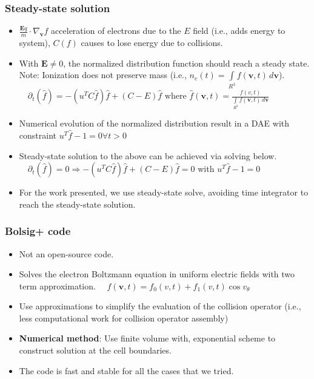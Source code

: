 \documentclass[mathserif, aspectratio=169]{beamer}
\newcommand{\vect}[1]{\boldsymbol{#1}}
\newcommand{\myint}{\int\limits}
\newcommand{\diff}[1]{\, d#1}
\begin{document}
\begin{frame}
	\frametitle{Steady-state solution}
	\begin{itemize}
		\item $\frac{\vect{E} q}{m} \cdot \nabla_{\vect{v}}f$ acceleration of electrons due to the $E$ field (i.e., adds energy to system), $C(f)$ causes to lose energy due to collisions. 
		\item With $\vect{E}\neq 0$, the normalized distribution function should reach a steady state. Note: Ionization does not preserve mass (i.e., $n_e(t)=\myint_{R^3} f(\vect{v},t) \diff{\vect{v}}$).
		$
		\displaystyle
		\quad
		\partial_t (\hat{f}) = -(u^T C \hat{f}) \hat{f} + (C-E)\hat{f} \text{ where } \hat{f}(\vect{v},t) = \frac{f(v,t)}{\myint_{R^3} f(\vect{v},t) \diff{\vect{v}}}
		$
		\item Numerical evolution of the normalized distribution result in a DAE with constraint $u^T \hat{f}-1=0 \forall t>0$
		\item Steady-state solution to the above can be achieved via solving below.  
		$
		\displaystyle
		\quad
		\partial_t (\hat{f}) = 0 \Rightarrow -(u^T C \hat{f}) \hat{f} + (C-E)\hat{f} =0
		$ with $u^T \hat{f}-1=0$
		\item For the work presented, we use steady-state solve, avoiding time integrator to reach the steady-state solution. 
	\end{itemize}
\end{frame}

\begin{frame}
	\frametitle{Bolsig+ code}
	\begin{itemize}
		\item Not an open-source code. 
		\item Solves the electron Boltzmann equation in uniform electric fields with two term approximation.
		$
		\displaystyle
		\quad
		f(\vect{v},t) = f_0(v, t) + f_1(v,t)\cos v_\theta
		$ 
		\item Use approximations to simplify the evaluation of the collision operator (i.e., less computational work for collision operator assembly)
		\item \textbf{Numerical method}: Use finite volume with, exponential scheme to construct solution at the cell boundaries.  
		\item The code is fast and stable for all the cases that we tried. 
	\end{itemize}
\end{frame}
\end{document}
